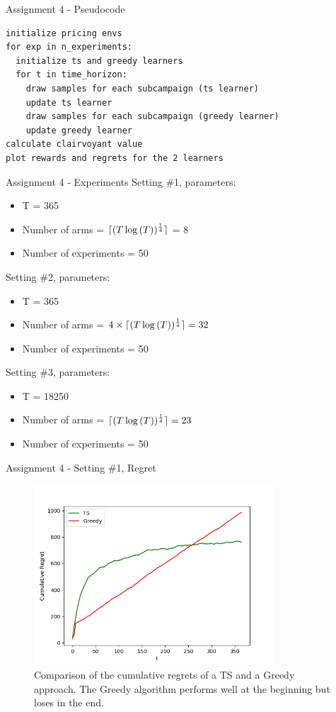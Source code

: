 \documentclass[11pt]{beamer}
\DeclarePairedDelimiter{\ceil}{\lceil}{\rceil}
\begin{document}
\begin{frame}[fragile]{Assignment 4 - Pseudocode}
\begin{lstlisting}
initialize pricing envs
for exp in n_experiments:
  initialize ts and greedy learners 
  for t in time_horizon:
    draw samples for each subcampaign (ts learner)
    update ts learner
    draw samples for each subcampaign (greedy learner)
    update greedy learner
calculate clairvoyant value
plot rewards and regrets for the 2 learners
\end{lstlisting}
\end{frame}

\begin{frame}{Assignment 4 - Experiments}
Setting \#1, parameters:
\begin{itemize}
\item T = 365
\item Number of arms = $\ceil{(T \log{(T)})^{\frac{1}{4}}}$ = 8
\item Number of experiments = 50
\end{itemize}
Setting \#2, parameters:
\begin{itemize}
\item T = 365
\item Number of arms = $4 \times \ceil{(T \log{(T)})^{\frac{1}{4}}} = 32$
\item Number of experiments = 50
\end{itemize}
Setting \#3, parameters:
\begin{itemize}
\item T = 18250
\item Number of arms = $\ceil{(T \log{(T)})^{\frac{1}{4}}} = 23$
\item Number of experiments = 50
\end{itemize}
\end{frame}

\begin{frame}{Assignment 4 - Setting \#1, Regret}
\begin{figure}[hbtp]
\centering
\includegraphics[width=0.8\textwidth]{images/assignment_4_exp_1_cum_regret.png}
\caption{Comparison of the cumulative regrets of a TS and a Greedy approach. The Greedy algorithm performs well at the beginning but loses in the end.}
\end{figure}
\end{frame}
\end{document}

